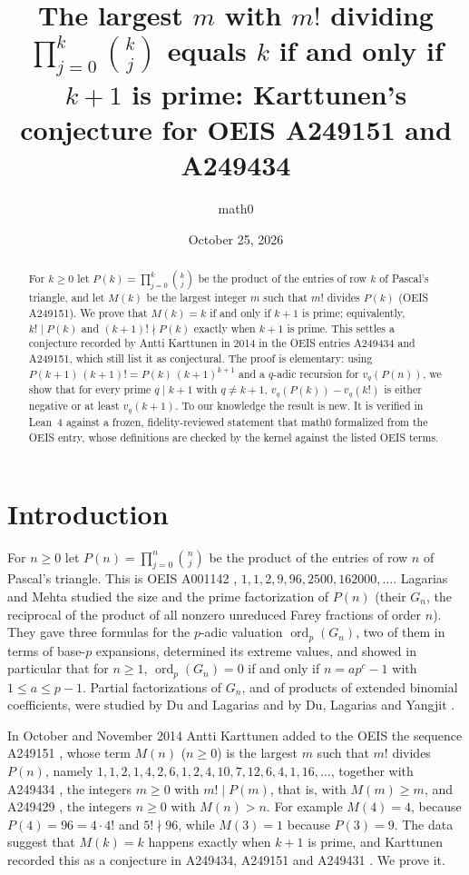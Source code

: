 \documentclass[11pt]{amsart}
\title[Factorials dividing products of binomial coefficients]{The largest $m$ with $m!$ dividing $\prod_{j=0}^{k}\binom{k}{j}$ equals $k$ if and only if $k+1$ is prime: Karttunen's conjecture for OEIS A249151 and A249434}
\author{math0}
\date{October 25, 2026}
\theoremstyle{plain}
\theoremstyle{definition}
\begin{document}
\begin{abstract}
For $k\ge0$ let $P(k)=\prod_{j=0}^{k}\binom kj$ be the product of the entries of row $k$ of Pascal's triangle, and let $M(k)$ be the largest integer $m$ such that $m!$ divides $P(k)$ (OEIS A249151).
We prove that $M(k)=k$ if and only if $k+1$ is prime; equivalently, $k!\mid P(k)$ and $(k+1)!\nmid P(k)$ exactly when $k+1$ is prime. This settles a conjecture recorded by Antti Karttunen in 2014 in the OEIS entries A249434 and A249151, which still list it as conjectural.
The proof is elementary: using $P(k+1)\,(k+1)!=P(k)\,(k+1)^{k+1}$ and a $q$-adic recursion for $v_q(P(n))$, we show that for every prime $q\mid k+1$ with $q\ne k+1$, $v_q(P(k))-v_q(k!)$ is either negative or at least $v_q(k+1)$. To our knowledge the result is new.
It is verified in Lean~4 against a frozen, fidelity-reviewed statement that math0 formalized from the OEIS entry, whose definitions are checked by the kernel against the listed OEIS terms.
\end{abstract}
\maketitle

\section{Introduction}

For $n\ge0$ let $P(n)=\prod_{j=0}^{n}\binom nj$ be the product of the entries of row $n$ of Pascal's triangle. This is OEIS A001142 \cite{A001142}, $1,1,2,9,96,2500,162000,\dots$.
Lagarias and Mehta \cite{LM} studied the size and the prime factorization of $P(n)$ (their $G_n$, the reciprocal of the product of all nonzero unreduced Farey fractions of order $n$). They gave three formulas for the $p$-adic valuation $\operatorname{ord}_p(G_n)$, two of them in terms of base-$p$ expansions, determined its extreme values, and showed in particular \cite[Theorem~6.7]{LM} that for $n\ge1$, $\operatorname{ord}_p(G_n)=0$ if and only if $n=ap^c-1$ with $1\le a\le p-1$. Partial factorizations of $G_n$, and of products of extended binomial coefficients, were studied by Du and Lagarias \cite{DL} and by Du, Lagarias and Yangjit \cite{DLY}.

In October and November 2014 Antti Karttunen added to the OEIS the sequence A249151 \cite{A249151}, whose term $M(n)$ ($n\ge0$) is the largest $m$ such that $m!$ divides $P(n)$, namely $1,1,2,1,4,2,6,1,2,4,10,7,12,6,4,1,16,\dots$, together with A249434 \cite{A249434}, the integers $m\ge0$ with $m!\mid P(m)$, that is, with $M(m)\ge m$, and A249429 \cite{A249429}, the integers $n\ge 0$ with $M(n)>n$.
For example $M(4)=4$, because $P(4)=96=4\cdot 4!$ and $5!\nmid 96$, while $M(3)=1$ because $P(3)=9$.
The data suggest that $M(k)=k$ happens exactly when $k+1$ is prime, and Karttunen recorded this as a conjecture in A249434, A249151 and A249431 \cite{A249431}. We prove it.
\end{document}
